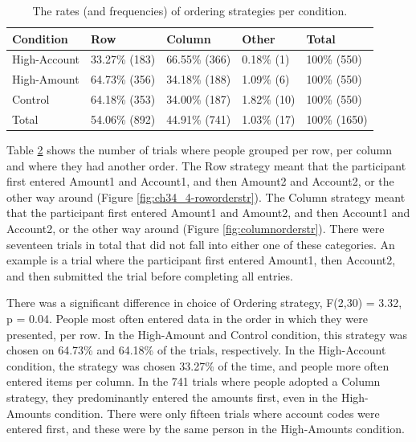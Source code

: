 \begin{table}
\begin{itemize}
\begin{table}[!ht]
\centering
\begin{tabular}{|l|l|l|l|l|}
\cline{1-5}
Condition    & Row           & Column      & Other       & Total      \\ \hline
High-Account & 33.27\% {\footnotesize (183)} & 66.55\% {\footnotesize (366)} & 0.18\% {\footnotesize(1)}  & 100\% {\footnotesize (550)}  \\ \hline
High-Amount  & 64.73\% {\footnotesize (356)} & 34.18\% {\footnotesize (188)} & 1.09\% {\footnotesize(6)}  & 100\% {\footnotesize (550)}  \\ \hline
Control      & 64.18\% {\footnotesize (353)} & 34.00\% {\footnotesize (187)} & 1.82\% {\footnotesize(10)}  & 100\% {\footnotesize (550)}  \\ \hline
Total        & 54.06\% {\footnotesize (892)} & 44.91\% {\footnotesize (741)} & 1.03\% {\footnotesize(17)} & 100\% {\footnotesize (1650)} \\ \hline
\end{tabular}
\caption{The rates (and frequencies) of ordering strategies per condition.}\label{table:ch34_4-str-order}
\end{table}

Table \ref{table:ch34_4-str-order} shows the number of trials where people grouped per row, per column and where they had another order. The Row strategy meant that the participant first entered Amount1 and Account1, and then Amount2 and Account2, or the other way around (Figure \ref{fig:ch34_4-roworderstr}). The Column strategy meant that the participant first entered Amount1 and Amount2, and then Account1 and Account2, or the other way around (Figure \ref{fig:columnorderstr}). There were seventeen trials in total that did not fall into either one of these categories. An example is a trial where the participant first entered Amount1, then Account2, and then submitted the trial before completing all entries.

There was a significant difference in choice of Ordering strategy, F(2,30) = 3.32, p = 0.04. People most often entered data in the order in which they were presented, per row. In the High-Amount and Control condition, this strategy was chosen on 64.73\% and 64.18\% of the trials, respectively. In the High-Account condition, the strategy was chosen 33.27\% of the time, and people more often entered items per column. In the 741 trials where people adopted a Column strategy, they predominantly entered the amounts first, even in the High-Amounts condition. There were only fifteen trials where account codes were entered first, and these were by the same person in the High-Amounts condition.


\end{itemize}
\end{table}
